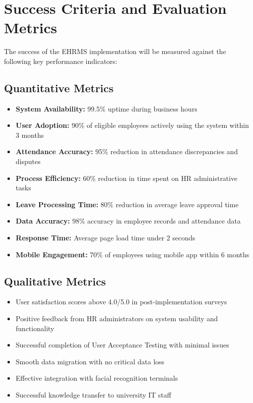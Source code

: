 \documentclass[12pt]{article}
\begin{document}
\section{Success Criteria and Evaluation Metrics}

The success of the EHRMS implementation will be measured against the following key performance indicators:

\subsection{Quantitative Metrics}

\begin{itemize}[noitemsep]
\item \textbf{System Availability:} 99.5\% uptime during business hours
\item \textbf{User Adoption:} 90\% of eligible employees actively using the system within 3 months
\item \textbf{Attendance Accuracy:} 95\% reduction in attendance discrepancies and disputes
\item \textbf{Process Efficiency:} 60\% reduction in time spent on HR administrative tasks
\item \textbf{Leave Processing Time:} 80\% reduction in average leave approval time
\item \textbf{Data Accuracy:} 98\% accuracy in employee records and attendance data
\item \textbf{Response Time:} Average page load time under 2 seconds
\item \textbf{Mobile Engagement:} 70\% of employees using mobile app within 6 months
\end{itemize}

\subsection{Qualitative Metrics}

\begin{itemize}[noitemsep]
\item User satisfaction scores above 4.0/5.0 in post-implementation surveys
\item Positive feedback from HR administrators on system usability and functionality
\item Successful completion of User Acceptance Testing with minimal issues
\item Smooth data migration with no critical data loss
\item Effective integration with facial recognition terminals
\item Successful knowledge transfer to university IT staff
\end{itemize}
\end{document}
